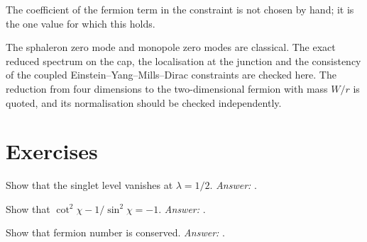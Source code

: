 The coefficient of the fermion term in the constraint is not chosen by hand; it is the one value for which this holds.

\begin{standsbox}
The sphaleron zero mode and monopole zero modes are classical. The exact reduced spectrum on the cap, the localisation at the junction and the consistency of the coupled Einstein--Yang--Mills--Dirac constraints are checked here. The reduction from four dimensions to the two-dimensional fermion with mass $W/r$ is quoted, and its normalisation should be checked independently.
\end{standsbox}

\section*{Exercises}
\begin{exercise}Show that the singlet level vanishes at $\lambda=1/2$. \emph{Answer:} .\end{exercise}
\begin{exercise}Show that $\cot^2\chi-1/\sin^2\chi=-1$. \emph{Answer:} .\end{exercise}
\begin{exercise}Show that fermion number is conserved. \emph{Answer:} .\end{exercise}
